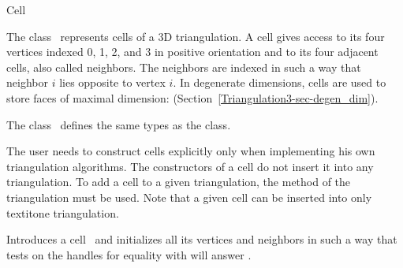 

\begin{ccRefClass}{Cell}  %


\ccDefinition
  
The class \ccRefName\ represents cells of a 3D triangulation. 
A cell gives access to its four vertices indexed 0,
1, 2, and 3 in positive orientation and to its four adjacent cells, also
called neighbors. The neighbors are indexed in such a way that neighbor
$i$ lies opposite to vertex $i$.
In degenerate dimensions, cells are used to store faces of maximal
dimension: (Section~\ref{Triangulation3-sec-degen_dim}).


\ccInheritsFrom
{}

\ccTypes

The class \ccRefName\ defines the same types as the
 class.

\begin{ccAdvanced}
\ccCreation

The user needs to construct cells explicitly only when implementing his
own triangulation algorithms. The constructors of a cell do not insert
it into any triangulation. To add a cell to a given triangulation,
the  method of the triangulation must be used. Note
that a given cell can be inserted into only textit{one} triangulation.

{Introduces a cell \ccVar\ and initializes all its vertices and
neighbors in such a way that tests on the handles for equality with
 will answer .} 


\end{ccAdvanced}
\end{ccRefClass}

